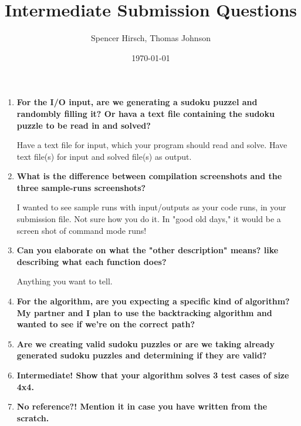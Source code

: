 \documentclass{article}
\begin{document}
\title{\textbf{Intermediate Submission Questions}}
\author{Spencer Hirsch, Thomas Johnson}
\date{\today}

\maketitle

\begin{enumerate}
    \item \textbf{For the I/O input, are we generating a sudoku puzzel and randombly 
    filling it? Or hava a text file containing the sudoku puzzle to be read in and
    solved?}

    Have a text file for input, which your program should read and solve.  
    Have text file(s) for input and solved file(s) as output. 

    \item \textbf{What is the difference between compilation screenshots and the three
    sample-runs screenshots? }

    I wanted to see sample runs with input/outputs as your code runs, in your submission 
    file. Not sure how you do it. In "good old days," it would be a screen shot of 
    command mode runs!

    \item \textbf{Can you elaborate on what the "other description" means? like describing 
    what each function does?}

    Anything you want to tell.

    \item \textbf{For the algorithm, are you expecting a specific kind of algorithm? My
    partner and I plan to use the backtracking algorithm and wanted to see if we're on
    the correct path?}

    \item \textbf{Are we creating valid sudoku puzzles or are we taking already generated 
    sudoku puzzles and determining if they are valid?}

    \item \textbf{Intermediate! Show that your algorithm solves 3 test cases of size 4x4.}
    
    \item \textbf{No reference?! Mention it in case you have written from the scratch.}

\end{enumerate}
\end{document}

